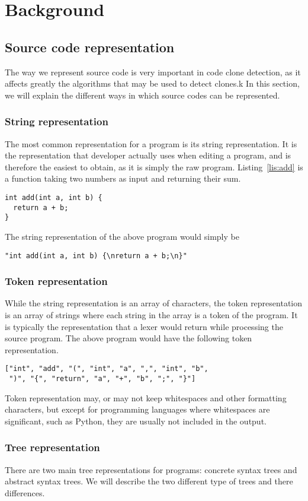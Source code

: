 \chapter{Background}
\section{Source code representation}
The way we represent source code is very important in code clone detection,
as it affects greatly the algorithms that may be used to detect clones.k
In this section, we will explain the different ways in which source codes
can be represented.
\subsection{String representation}
The most common representation for a program is its string representation. It is
the representation that developer actually uses when editing a program, and
is therefore the easiest to obtain, as it is simply the raw program.
Listing~\ref{lis:add} is a function taking two numbers as input and returning
their sum.
\begin{lstlisting}[caption=\lstinline{add} function,label=lis:add]
int add(int a, int b) {
  return a + b;
}
\end{lstlisting}
The string representation of the above program would simply be
\begin{lstlisting}
"int add(int a, int b) {\nreturn a + b;\n}"
\end{lstlisting}
\subsection{Token representation}
While the string representation is an array of characters, the token
representation is an array of strings where each string in the array is a token
of the program. It is typically the representation that a lexer would return
while processing the source program. The above program would have the following
token representation.
\begin{lstlisting}
["int", "add", "(", "int", "a", ",", "int", "b",
 ")", "{", "return", "a", "+", "b", ";", "}"]
\end{lstlisting}
Token representation may, or may not keep whitespaces and other formatting
characters, but except for programming languages where whitespaces are significant,
such as Python, they are usually not included in the output.
\subsection{Tree representation}
There are two main tree representations for programs: concrete syntax trees and
abstract syntax trees. We will describe the two different type of trees and
there differences.
